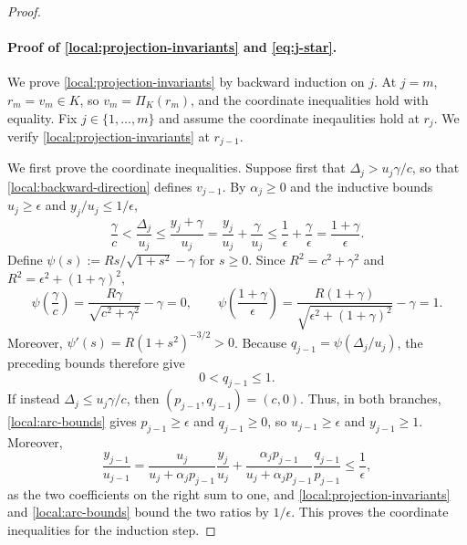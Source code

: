 \documentclass[11pt,letterpaper]{article}
\theoremstyle{definition}
\begin{document}
\begin{proof}
\paragraph{Proof of \eqref{local:projection-invariants} and \eqref{eq:j-star}.}
We prove \eqref{local:projection-invariants} by backward induction on \(j\). At \(j=m\), \(r_m=v_m\in K\), so \(v_m=\Pi_K(r_m)\), and the coordinate inequalities hold with equality. 
Fix \(j\in\{1,\ldots,m\}\) and assume the coordinate ineqaulities hold at \(r_j\). We verify \eqref{local:projection-invariants} at \(r_{j-1}\).

We first prove the coordinate inequalities. Suppose first that $\Delta_j>u_j\gamma/c$, so that \eqref{local:backward-direction} defines $v_{j-1}$.
By $\alpha_j\ge0$ and the inductive bounds $u_j\ge\epsilon$ and $y_j/u_j\le1/\epsilon$,
\[
  \frac\gamma c<\frac{\Delta_j}{u_j}
  \le\frac{y_j+\gamma}{u_j}
  =\frac{y_j}{u_j}+\frac\gamma{u_j}
  \le\frac1\epsilon+\frac\gamma\epsilon
  =\frac{1+\gamma}{\epsilon}.
\]
Define $\psi(s):=Rs/\sqrt{1+s^2}-\gamma$ for $s\ge0$.
Since $R^2=c^2+\gamma^2$ and $R^2=\epsilon^2+(1+\gamma)^2$,
\[
  \psi\!\left(\frac\gamma c\right)
  =\frac{R\gamma}{\sqrt{c^2+\gamma^2}}-\gamma=0,
  \qquad
  \psi\!\left(\frac{1+\gamma}{\epsilon}\right)
  =\frac{R(1+\gamma)}{\sqrt{\epsilon^2+(1+\gamma)^2}}-\gamma=1.
\]
Moreover, $\psi'(s)=R(1+s^2)^{-3/2}>0$.
Because $q_{j-1}=\psi(\Delta_j/u_j)$, the preceding bounds therefore give
\[
  0<q_{j-1}\le1.
\]
If instead $\Delta_j\le u_j\gamma/c$, then $(p_{j-1},q_{j-1})=(c,0)$.
Thus, in both branches, \eqref{local:arc-bounds} gives $p_{j-1}\ge\epsilon$ and $q_{j-1}\ge0$, so $u_{j-1}\ge\epsilon$ and $y_{j-1}\ge1$.
Moreover,
\[
  \frac{y_{j-1}}{u_{j-1}}
  =\frac{u_j}{u_j+\alpha_jp_{j-1}}\frac{y_j}{u_j}
   +\frac{\alpha_jp_{j-1}}{u_j+\alpha_jp_{j-1}}
    \frac{q_{j-1}}{p_{j-1}}
  \le\frac1\epsilon,
\]
as the two coefficients on the right sum to one, and \eqref{local:projection-invariants} and \eqref{local:arc-bounds} bound the two ratios by $1/\epsilon$.
This proves the coordinate inequalities for the induction step.


\end{proof}
\end{document}
